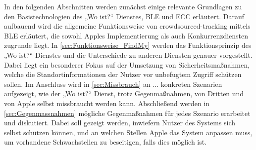 In den folgenden Abschnitten werden zunächst einige relevante Grundlagen zu den Basistechnologien des „Wo ist?“ Dienstes, \ac{BLE} und \ac{ECC} erläutert.
Darauf aufbauend wird die allgemeine Funktionsweise von crowdsourced-tracking mittels \ac{BLE} erläutert, die sowohl Apples Implementierung als auch Konkurrenzdiensten zugrunde liegt.
In \autoref{sec:Funktionsweise_FindMy} werden das Funktionsprinzip des „Wo ist?“ Dienstes und die Unterschiede zu anderen Diensten genauer vorgestellt.
Dabei liegt ein besonderer Fokus auf der Umsetzung von Sicherheitsmaßnahmen, welche die Standortinformationen der Nutzer vor unbefugtem Zugriff schützen sollen.
Im Anschluss wird in \autoref{sec:Missbrauch} an ... konkreten Szenarien aufgezeigt, wie der „Wo ist?“ Dienst, trotz Gegenmaßnahmen, von Dritten und von Apple selbst missbraucht werden kann.
Abschließend werden in \autoref{sec:Gegenmassnahmen} mögliche Gegenmaßnahmen für jedes Szenario erarbeitet und diskutiert.
Dabei soll gezeigt werden, inwiefern Nutzer des Systems sich selbst schützen können, und an welchen Stellen Apple das System anpassen muss, um vorhandene Schwachstellen zu beseitigen, falls dies möglich ist.